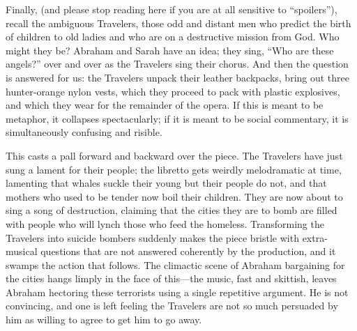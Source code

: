 Finally, (and please stop reading here if you are at all sensitive to “spoilers”), recall the ambiguous Travelers, those odd and distant men who predict the birth of children to old ladies and who are on a destructive mission from God. Who might they be? Abraham and Sarah have an idea; they sing, “Who are these angels?” over and over as the Travelers sing their chorus. And then the question is answered for us: the Travelers unpack their leather backpacks, bring out three hunter-orange nylon vests, which they proceed to pack with plastic explosives, and which they wear for the remainder of the opera. If this is meant to be metaphor, it collapses spectacularly; if it is meant to be social commentary, it is simultaneously confusing and risible.

This casts a pall forward and backward over the piece. The Travelers have just sung a lament for their people; the libretto gets weirdly melodramatic at time, lamenting that whales suckle their young but their people do not, and that mothers who used to be tender now boil their children. They are now about to sing a song of destruction, claiming that the cities they are to bomb are filled with people who will lynch those who feed the homeless. Transforming the Travelers into suicide bombers suddenly makes the piece bristle with extra-musical questions that are not answered coherently by the production, and it swamps the action that follows. The climactic scene of Abraham bargaining for the cities hangs limply in the face of this—the music, fast and skittish, leaves Abraham hectoring these terrorists using a single repetitive argument. He is not convincing, and one is left feeling the Travelers are not so much persuaded by him as willing to agree to get him to go away.

